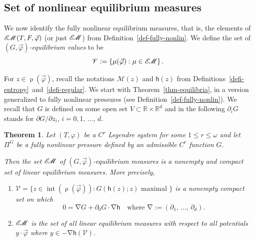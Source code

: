 \documentclass[10pt]{amsart}
\newtheorem{theo}{Theorem}[section]
\theoremstyle{definition}\newtheorem{defi}[theo]{Definition}\newtheorem{rema}[theo]{Remark}\newtheorem{exam}[theo]{Example}\newtheorem{exem}[theo]{Example}\newtheorem{nota}[theo]{Notation}
\theoremstyle{plain}
\theoremstyle{plain}
\newcommand\vpot{\vec\pot}
\DeclareMathOperator{\interior}{int}
\newcommand{\rs}{\operatorname{\rho}}
\newcommand{\grad}{\operatorname{\nabla}}
\newcommand{\hf}{\mathsf{h}}
\newcommand{\EM}{\mathscr{E\kern-2pt M}}
\newcommand{\pot}{\varphi}
\newcommand*\8{\infty}
\newcommand*\R{\mathbb{R}}
\newcommand{\cM}{\mathcal{M}}
\newcommand{\scV}{\mathscr{V}}
\newcommand*{\romanenumi}{\renewcommand*{\theenumi}{\roman{enumi}}}
\begin{document}
\subsection{Set of nonlinear equilibrium measures}


We now identify the fully nonlinear equilibrium measures, that is, the elements of $\EM(T,F,\vpot)$ (or just $\EM$) from Definition~\ref{def-fully-nonlin}. We define the set of \emph{$(G,\vpot)$-equilibrium values} to be
\[
\scV:=\left\{\mu(\vpot):\mu\in\EM\right\}.
\]

For $ z\in \rs(\vpot)$, recall the notations $\cM(z)$ and $\hf(z)$ from Definitions~\ref{defi-entropy}~and~\ref{defi-regular}. We start with Theorem~\ref{thm-equilibria}, in a version generalized to fully nonlinear pressures (see Definition~\ref{def-fully-nonlin}). We recall that $G$ is defined on some open set $V\subset \R\times \R^{d}$ and in the following $\partial_{i}G$ stands for $\partial G/\partial z_{i}$, $i=0,1,\,\ldots,\,d$.


\begin{theo}\label{thm:equilibria-G}
Let $(T, \pot)$ be a {$C^r$ Legendre system} for some $1\leq r\leq\omega$ and let $\Pi^G$ be a fully nonlinear pressure defined by an admissible $C^r$ function $G$.

Then the set $\EM$ of $(G,\vpot)$-equilibrium measures is a nonempty and compact set of linear equilibrium measures. More precisely,
\begin{enumerate}\romanenumi
\item\label{enumi:equilibria-G-i}
$\scV = \{ z\in\interior(\rs(\vpot)):G(\hf(z); z)\text{ maximal }\}$ is a nonempty compact set on which
\begin{equation}\label{eq-gradg}
0 = \grad G + \partial_{0} G \cdot \grad \hf \quad \text{where } \grad := \left(\partial_1,\,\dots,\,\partial_d\right).
\end{equation}
\item\label{enumi:equilibria-G-ii}
$ \EM$ is the set of all linear equilibrium measures with respect to all potentials $y\cdot\vec\pot$ where $y \in -\grad \hf(\scV)$.
\end{enumerate}
\end{theo}
\end{document}
